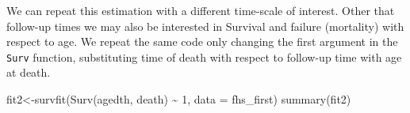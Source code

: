 \documentclass[
]{book}
\newenvironment{Shaded}{\begin{snugshade}}{\end{snugshade}}
\newcommand{\AttributeTok}[1]{\textcolor[rgb]{0.77,0.63,0.00}{#1}}
\newcommand{\DecValTok}[1]{\textcolor[rgb]{0.00,0.00,0.81}{#1}}
\newcommand{\FunctionTok}[1]{\textcolor[rgb]{0.00,0.00,0.00}{#1}}
\newcommand{\NormalTok}[1]{#1}
\newcommand{\OtherTok}[1]{\textcolor[rgb]{0.56,0.35,0.01}{#1}}
\newcommand{\SpecialCharTok}[1]{\textcolor[rgb]{0.00,0.00,0.00}{#1}}
\begin{document}
We can repeat this estimation with a different time-scale of interest. Other that follow-up times we may also be interested in Survival and failure (mortality) with respect to age. We repeat the same code only changing the first argument in the \texttt{Surv} function, substituting time of death with respect to follow-up time with age at death.

\begin{Shaded}
\begin{Highlighting}[]
\NormalTok{fit2}\OtherTok{\textless{}{-}}\FunctionTok{survfit}\NormalTok{(}\FunctionTok{Surv}\NormalTok{(agedth, death) }\SpecialCharTok{\textasciitilde{}} \DecValTok{1}\NormalTok{, }\AttributeTok{data =}\NormalTok{ fhs\_first)}
\FunctionTok{summary}\NormalTok{(fit2)}
\end{Highlighting}
\end{Shaded}
\end{document}
